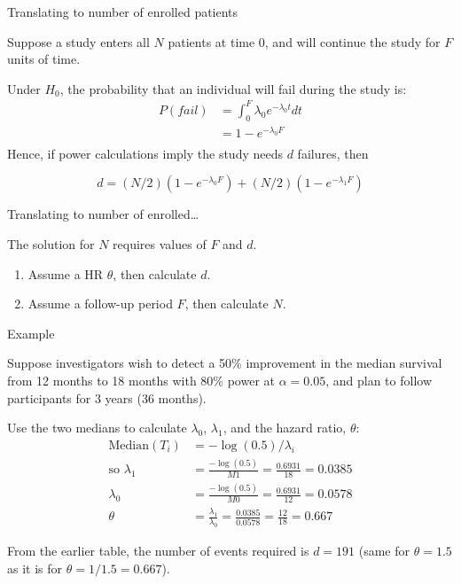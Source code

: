\documentclass[ignorenonframetext,]{beamer}
\begin{document}
\begin{frame}{%
\protect\hypertarget{translating-to-number-of-enrolled-patients}{%
Translating to number of enrolled patients}}

Suppose a study enters all \(N\) patients at time 0, and will continue
the study for \(F\) units of time.

Under \(H_0\), the probability that an individual will fail during the
study is: \begin{align*}  
P(fail)   &=    \int_{0}^{F} \lambda_0 e^{-\lambda_0 t} dt\\[1ex]
   &=   1- e^{-\lambda_0 F}\\
\end{align*} Hence, if power calculations imply the study needs \(d\)
failures, then

\[  d = (N/2)(1 - e^{-\lambda_0 F}) + (N/2)(1 - e^{-\lambda_1 F})\]

\end{frame}

\begin{frame}{%
\protect\hypertarget{translating-to-number-of-enrolled}{%
Translating to number of enrolled\ldots}}

The solution for \(N\) requires values of \(F\) and \(d\).

\begin{enumerate}
[1.]
\item
  Assume a HR \(\theta\), then calculate \(d\).
\item
  Assume a follow-up period \(F\), then calculate \(N\).
\end{enumerate}

\end{frame}

\begin{frame}{%
\protect\hypertarget{example-2}{%
Example}}

Suppose investigators wish to detect a 50\% improvement in the median
survival from 12 months to 18 months with 80\% power at \(\alpha=0.05\),
and plan to follow participants for 3 years (36 months).

Use the two medians to calculate \(\lambda_0\), \(\lambda_1\), and the
hazard ratio, \(\theta\): \begin{align*}
\text{Median}(T_i) &= -\log(0.5)/\lambda_i \\[1ex]
\text{so } 
\lambda_1 &=  \frac{-\log(0.5)}{M1} = \frac{0.6931}{18} = 0.0385\\[1ex]
\lambda_0 &=  \frac{-\log(0.5)}{M0} = \frac{0.6931}{12} = 0.0578\\[1ex]
\theta &= \frac{\lambda_1}{\lambda_0} = \frac{0.0385}{0.0578} 
= \frac{12}{18} = 0.667
\end{align*}

From the earlier table, the number of events required is \(d=191\) (same
for \(\theta=1.5\) as it is for \(\theta = 1/1.5=0.667\)).

\end{frame}
\end{document}
